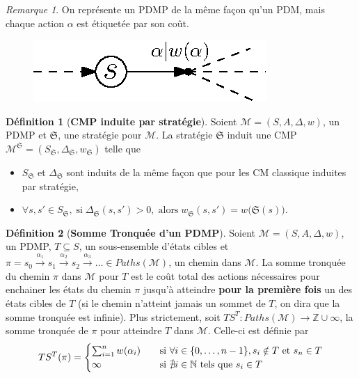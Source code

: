 \documentclass[12pt,a4paper]{report}
\theoremstyle{definition}%
\newtheorem{definition}{Définition}[chapter]
\theoremstyle{remark}
\newtheorem{remark}{Remarque}[chapter]
\let\labelitemi\labelitemii
\begin{document}
\begin{remark}
	On représente un PDMP de la même façon qu'un PDM, mais chaque action $\alpha$
	est étiquetée par son coût.
	\begin{figure}[H]
	\centering
		\includegraphics{figures/PDMP-example}
	\end{figure}
\end{remark}

\begin{definition}[\textbf{CMP induite par stratégie}]
	Soient $\mathcal{M} = (S, A, \Delta, w)$, un PDMP et $\mathfrak{S}$, une
	stratégie pour $\mathcal{M}$. La stratégie $\mathfrak{S}$ induit une CMP
	$\mathcal{M}^\mathfrak{S} = (S_\mathfrak{S}, \Delta_\mathfrak{S}, w_\mathfrak{S})$ telle que
	\begin{itemize}
		\renewcommand{\labelitemi}{\tiny$\bullet$}
		\item $S_\mathfrak{S}$ et $\Delta_\mathfrak{S}$ sont induits de la même
			façon que pour les CM classique induites par stratégie,
		\item
			$\forall s, s' \in S_{\mathfrak{S}}, \; \text{si} \;
			\Delta_{\mathfrak{S}}(s, s') > 0, \; \text{alors} \; w_{\mathfrak{S}}(s, s') = w\big(\mathfrak{S}(s)\big)$.
	\end{itemize}
\end{definition}


\begin{definition}[\textbf{Somme Tronquée d'un PDMP}]
	Soient $\mathcal{M} = (S, A, \Delta, w)$, un PDMP, $T \subseteq S$, un
	sous-ensemble d'états cibles et
	$\pi = s_0 \xrightarrow{\alpha_1} s_1 \xrightarrow{\alpha_2} s_2 \xrightarrow{\alpha_3} \dots \in Paths(\mathcal{M})$, un chemin dans
	$\mathcal{M}$. La somme tronquée du chemin $\pi$ dans $\mathcal{M}$ pour $T$
	est le coût total des actions nécessaires pour enchainer les états du chemin
	$\pi$ jusqu'à atteindre \textbf{pour la première fois} un des états cibles de
	$T$ (si le chemin n'atteint jamais un sommet de $T$, on dira que la somme
	tronquée est infinie). Plus strictement, soit $TS^T : Paths(\mathcal{M})
	\rightarrow \mathbb{Z} \cup {\infty}$, la somme tronquée de $\pi$ pour atteindre $T$ dans
	$\mathcal{M}$. Celle-ci est définie par
	\[
		TS^T(\pi) =
		\begin{cases}
			\sum_{i = 1}^{n} w(\alpha_i) & \quad \text{si } \forall i \in \{0, \dots, n - 1\}, s_i \notin T \text{ et } s_n \in T \\
			\infty & \quad \text{si $ \nexists i \in \mathbb{N}$ tels que $s_i \in T$}
		\end{cases}
	\]
	\\
\end{definition}
\end{document}
